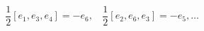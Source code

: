 \begin{equation}
\frac{1}{2}[e_1,e_3,e_4]=-e_6,~~~~ \frac{1}{2}[e_2,e_6,e_3]=-e_5, \ldots
\end{equation}


